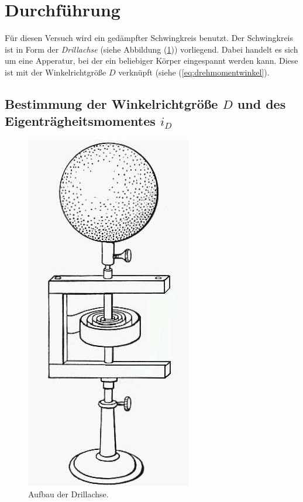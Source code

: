 \section{Durchführung}
\label{sec:Durchführung}

Für diesen Versuch wird ein gedämpfter Schwingkreis benutzt.
Der Schwingkreis ist in Form der \textit{Drillachse} (siehe Abbildung (\ref{fig:drillachse})) vorliegend.
Dabei handelt es sich um eine Apperatur, bei der ein beliebiger Körper eingespannt werden kann.
Diese ist mit der Winkelrichtgröße $D$ verknüpft (siehe (\ref{eq:drehmomentwinkel}).

\subsection{Bestimmung der Winkelrichtgröße $D$ und des Eigenträgheitsmomentes $i_{D}$} \label{subsec:Winkelrichtgröße}

\begin{figure}
    \centering
    \includegraphics{pictures/Drillachse.png}
    \caption{Aufbau der Drillachse. \cite{v101}}
    \label{fig:drillachse}
\end{figure}


